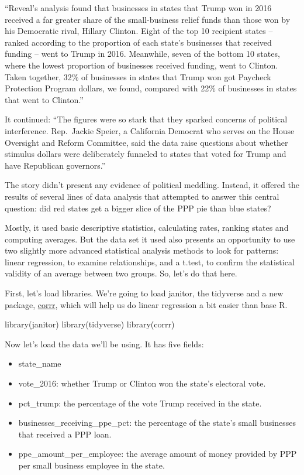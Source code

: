 \documentclass[
  letterpaper,
  DIV=11,
  numbers=noendperiod]{scrreprt}
\newenvironment{Shaded}{\begin{snugshade}}{\end{snugshade}}
\newcommand{\FunctionTok}[1]{\textcolor[rgb]{0.28,0.35,0.67}{#1}}
\newcommand{\NormalTok}[1]{\textcolor[rgb]{0.00,0.23,0.31}{#1}}
\providecommand{\tightlist}{%
  \setlength{\itemsep}{0pt}\setlength{\parskip}{0pt}}\usepackage{longtable,booktabs,array}
\begin{document}
``Reveal's analysis found that businesses in states that Trump won in
2016 received a far greater share of the small-business relief funds
than those won by his Democratic rival, Hillary Clinton. Eight of the
top 10 recipient states -- ranked according to the proportion of each
state's businesses that received funding -- went to Trump in 2016.
Meanwhile, seven of the bottom 10 states, where the lowest proportion of
businesses received funding, went to Clinton. Taken together, 32\% of
businesses in states that Trump won got Paycheck Protection Program
dollars, we found, compared with 22\% of businesses in states that went
to Clinton.''

It continued: ``The figures were so stark that they sparked concerns of
political interference. Rep.~Jackie Speier, a California Democrat who
serves on the House Oversight and Reform Committee, said the data raise
questions about whether stimulus dollars were deliberately funneled to
states that voted for Trump and have Republican governors.''

The story didn't present any evidence of political meddling. Instead, it
offered the results of several lines of data analysis that attempted to
answer this central question: did red states get a bigger slice of the
PPP pie than blue states?

Mostly, it used basic descriptive statistics, calculating rates, ranking
states and computing averages. But the data set it used also presents an
opportunity to use two slightly more advanced statistical analysis
methods to look for patterns: linear regression, to examine
relationships, and a t.test, to confirm the statistical validity of an
average between two groups. So, let's do that here.

First, let's load libraries. We're going to load janitor, the tidyverse
and a new package, \href{https://corrr.tidymodels.org/}{corrr}, which
will help us do linear regression a bit easier than base R.

\begin{Shaded}
\begin{Highlighting}[]
\FunctionTok{library}\NormalTok{(janitor)}
\FunctionTok{library}\NormalTok{(tidyverse)}
\FunctionTok{library}\NormalTok{(corrr)}
\end{Highlighting}
\end{Shaded}

Now let's load the data we'll be using. It has five fields:

\begin{itemize}
\tightlist
\item
  state\_name
\item
  vote\_2016: whether Trump or Clinton won the state's electoral vote.
\item
  pct\_trump: the percentage of the vote Trump received in the state.
\item
  businesses\_receiving\_ppe\_pct: the percentage of the state's small
  businesses that received a PPP loan.
\item
  ppe\_amount\_per\_employee: the average amount of money provided by
  PPP per small business employee in the state.
\end{itemize}
\end{document}
